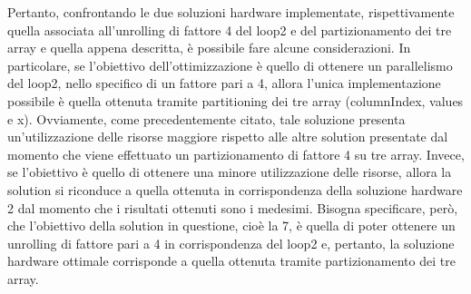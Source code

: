 Pertanto, confrontando le due soluzioni hardware implementate, rispettivamente quella associata all'unrolling di fattore 4 del loop2 e del partizionamento dei tre array e quella appena descritta, è possibile fare alcune considerazioni. In particolare, se l'obiettivo dell'ottimizzazione è quello di ottenere un parallelismo del loop2, nello specifico di un fattore pari a 4, allora l'unica implementazione possibile è quella ottenuta tramite partitioning dei tre array (columnIndex, values e x). Ovviamente, come precedentemente citato, tale soluzione presenta un'utilizzazione delle risorse maggiore rispetto alle altre solution presentate dal momento che viene effettuato un partizionamento di fattore 4 su tre array. Invece, se l'obiettivo è quello di ottenere una minore utilizzazione delle risorse, allora la solution si riconduce a quella ottenuta in corrispondenza della soluzione hardware 2 dal momento che i risultati ottenuti sono i medesimi. Bisogna specificare, però, che l'obiettivo della solution in questione, cioè la 7, è quella di poter ottenere un unrolling di fattore pari a 4 in corrispondenza del loop2 e, pertanto, la soluzione hardware ottimale corrisponde a quella ottenuta tramite partizionamento dei tre array.
